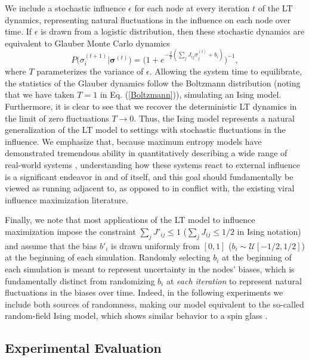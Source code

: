 \documentclass[letterpaper]{article} %
\begin{document}
We include a stochastic influence $\epsilon$ for each node at every iteration $t$ of the LT dynamics, representing natural fluctuations in the influence on each node over time. If $\epsilon$ is drawn from a logistic distribution, then these stochastic dynamics are equivalent to Glauber Monte Carlo dynamics \cite{Newman-02}
\begin{equation}
P\big(\sigma_i^{(t+1)}\big|\bm{\sigma}^{(t)}\big) = \Big(1+e^{-\frac{2}{T}(\sum_j J_{ij}\sigma_j^{(t)} + b_i)}\Big)^{-1},
\end{equation}
where $T$ parameterizes the variance of $\epsilon$. Allowing the system time to equilibrate, the statistics of the Glauber dynamics follow the Boltzmann distribution (noting that we have taken $T=1$ in Eq. (\ref{Boltzmann})), simulating an Ising model. Furthermore, it is clear to see that we recover the deterministic LT dynamics in the limit of zero fluctuations $T\rightarrow 0$. Thus, the Ising model represents a natural generalization of the LT model to settings with stochastic fluctuations in the influence. We emphasize that, because maximum entropy models have demonstrated tremendous ability in quantitatively describing a wide range of real-world systems \cite{Schneidman-01,Ganmor-01,Bialek-01,Phillips-01,Stein-01,Kapur-01}, understanding how these systems react to external influence is a significant endeavor in and of itself, and this goal should fundamentally be viewed as running adjacent to, as opposed to in conflict with, the existing viral influence maximization literature.

Finally, we note that most applications of the LT model to influence maximization impose the constraint $\sum_jJ'_{ij} \le 1$ ($\sum_jJ_{ij} \le 1/2$ in Ising notation) and assume that the bias $b'_i$ is drawn uniformly from $[0,1]$ ($b_i\sim\mathcal{U}[-1/2,1/2]$) at the beginning of each simulation. Randomly selecting $b_i$ at the beginning of each simulation is meant to represent uncertainty in the nodes' biases, which is fundamentally distinct from randomizing $b_i$ at \textit{each iteration} to represent natural fluctuations in the biases over time. Indeed, in the following experiments we include both sources of randomness, making our model equivalent to the so-called random-field Ising model, which shows similar behavior to a spin glass \cite{Nattermann-01}.

\subsection{Experimental Evaluation}
\end{document}
